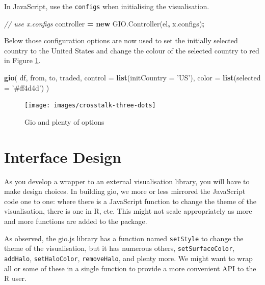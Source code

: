 \documentclass[10pt,]{krantz}
\makeatletter
\newenvironment{Shaded}{\begin{snugshade}}{\end{snugshade}}
\newcommand{\AttributeTok}[1]{\textcolor[rgb]{0.61,0.61,0.61}{#1}}
\newcommand{\CommentTok}[1]{\textcolor[rgb]{0.37,0.37,0.37}{\textit{#1}}}
\newcommand{\DataTypeTok}[1]{\textcolor[rgb]{0.27,0.27,0.27}{#1}}
\newcommand{\KeywordTok}[1]{\textcolor[rgb]{0.27,0.27,0.27}{\textbf{#1}}}
\newcommand{\NormalTok}[1]{#1}
\newcommand{\OperatorTok}[1]{\textcolor[rgb]{0.43,0.43,0.43}{\textbf{#1}}}
\newcommand{\StringTok}[1]{\textcolor[rgb]{0.5,0.5,0.5}{#1}}
\newcommand{\VariableTok}[1]{\textcolor[rgb]{0,0,0}{#1}}
\newenvironment{kframe}{%
\medskip{}
\setlength{\fboxsep}{.8em}
 \def\at@end@of@kframe{}%
 \ifinner\ifhmode%
  \def\at@end@of@kframe{\end{minipage}}%
  \begin{minipage}{\columnwidth}%
 \fi\fi%
 \def\FrameCommand##1{\hskip\@totalleftmargin \hskip-\fboxsep
 \colorbox{shadecolor}{##1}\hskip-\fboxsep
     \hskip-\linewidth \hskip-\@totalleftmargin \hskip\columnwidth}%
 \MakeFramed {\advance\hsize-\width
   \@totalleftmargin\z@ \linewidth\hsize
   \@setminipage}}%
 {\par\unskip\endMakeFramed%
 \at@end@of@kframe}
\renewenvironment{Shaded}{\begin{kframe}}{\end{kframe}}
\makeatother
\begin{document}
In JavaScript, use the \texttt{configs} when initialising the visualisation.

\begin{Shaded}
\begin{Highlighting}[]
\CommentTok{// use x.configs}
\NormalTok{controller }\OperatorTok{=} \KeywordTok{new} \VariableTok{GIO}\NormalTok{.}\AttributeTok{Controller}\NormalTok{(el}\OperatorTok{,} \VariableTok{x}\NormalTok{.}\AttributeTok{configs}\NormalTok{)}\OperatorTok{;}
\end{Highlighting}
\end{Shaded}

Below those configuration options are now used to set the initially selected country to the United States and change the colour of the selected country to red in Figure \ref{fig:crosstalk-three-dots}.

\begin{Shaded}
\begin{Highlighting}[]
\KeywordTok{gio}\NormalTok{(}
\NormalTok{  df, from, to, traded, }
  \DataTypeTok{control =} \KeywordTok{list}\NormalTok{(}\DataTypeTok{initCountry =} \StringTok{'US'}\NormalTok{), }
  \DataTypeTok{color =} \KeywordTok{list}\NormalTok{(}\DataTypeTok{selected =} \StringTok{'#ff4d4d'}\NormalTok{)}
\NormalTok{) }
\end{Highlighting}
\end{Shaded}

\begin{figure}[H]

{\centering \texttt{[image: images/crosstalk-three-dots]} 

}

\caption{Gio and plenty of options}\label{fig:crosstalk-three-dots}
\end{figure}

\hypertarget{widgets-final-interface}{%
\section{Interface Design}\label{widgets-final-interface}}

As you develop a wrapper to an external visualisation library, you will have to make design choices. In building gio, we more or less mirrored the JavaScript code one to one: where there is a JavaScript function to change the theme of the visualisation, there is one in R, etc. This might not scale appropriately as more and more functions are added to the package.

As observed, the gio.js library has a function named \texttt{setStyle} to change the theme of the visualisation, but it has numerous others, \texttt{setSurfaceColor}, \texttt{addHalo}, \texttt{setHaloColor}, \texttt{removeHalo}, and plenty more. We might want to wrap all or some of these in a single function to provide a more convenient API to the R user.
\end{document}
